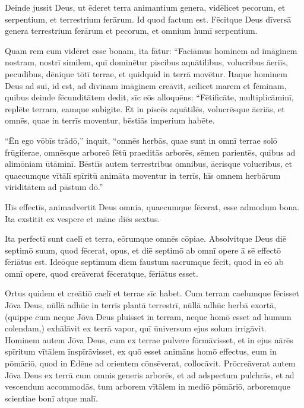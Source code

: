 \Versus Deinde jussit Deus, ut ēderet terra animantium genera, vidēlicet pecorum, et serpentium, et terrestrium ferārum. Id quod factum est.
\Versus Fēcitque Deus dīversā genera terrestrium ferārum et pecorum, et omnium humī serpentium.


Quam rem cum vidēret esse bonam,
\Versus ita fātur: ``Faciāmus hominem ad imāginem nostram, nostrī similem, quī dominētur piscibus aquātilibus, volucribus āeriīs, pecudibus, dēnique tōtī terrae, et quidquid in terrā movētur.
\Versus Itaque hominem Deus ad suī, id est, ad dīvīnam imāginem creāvit, scīlicet marem et fēminam,
\Versus quibus deinde fēcunditātem dedit, sīc eōs alloquēns: ``Fētificāte, multiplicāminī, replēte terram, eamque subigite. Et in piscēs aquātilēs, volucrēsque āeriās, et omnēs, quae in terrīs moventur, bēstiās imperium habēte.

\Versus ``Ēn ego vōbīs trādō,'' inquit, ``omnēs herbās, quae sunt in omnī terrae solō frūgiferae, omnēsque arboreō fētū praeditās arborēs, sēmen parientēs, quibus ad alimōniam ūtāminī.
\Versus Bēstiīs autem terrestribus omnibus, āerisque volucribus, et quaecumque vītālī spīritū animāta moventur in terrīs, hīs omnem herbārum viriditātem ad pāstum dō.''

\Versus Hīs effectīs, animadvertit Deus omnia, quaecumque fēcerat, esse admodum bona. Ita exstitit ex vespere et māne diēs sextus.



\Caput
\Versus Ita perfectī sunt caelī et terra, eōrumque omnēs cōpiae.
\Versus Absolvitque Deus diē septimō suum, quod fēcerat, opus, et diē septimō ab omnī opere ā sē effectō fēriātus est.
\Versus Ideōque septimum diem faustum sacrumque fēcit, quod in eō ab omnī opere, quod creāverat fēceratque, fēriātus esset.%


\Versus Ortus quidem et creātiō caelī et terrae sīc habet. Cum terram caelumque fēcisset Jōva Deus,
\Versus nūllā adhūc in terrīs plantā terrestrī, nūllā adhūc herbā exortā, (quippe cum neque Jōva Deus pluisset in terram, neque homō esset ad humum colendam,)
\Versus exhālāvit ex terrā vapor, quī ūniversum ejus solum irrigāvit.
\Versus Hominem autem Jōva Deus, cum ex terrae pulvere fōrmāvisset, et in ejus nārēs spīritum vītālem īnspīrāvisset, ex quō esset animāns homō effectus,
\Versus eum in pōmāriō, quod in Ēdēne ad orientem cōnsēverat, collocāvit.
\Versus Prōcreāverat autem Jōva Deus ex terrā cum omnis generis arborēs, et ad adspectum pulchrās, et ad vescendum accommodās, tum arborem vītālem in mediō pōmāriō, arboremque scientiae bonī atque malī.

